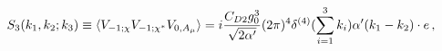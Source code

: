 \begin{equation}
 S_3 (k_1,k_2;k_3)\equiv \langle V_{-1;\chi} V_{-1;\chi^*}
V_{0,A_\mu}\rangle = i{{C_{D2}g_0^3}\over \sqrt{2\alpha'}}
(2\pi)^4\delta^{(4)}(\sum_{i=1}^3k_i) \alpha' (k_1-k_2)\cdot e \,
,
\end{equation}


